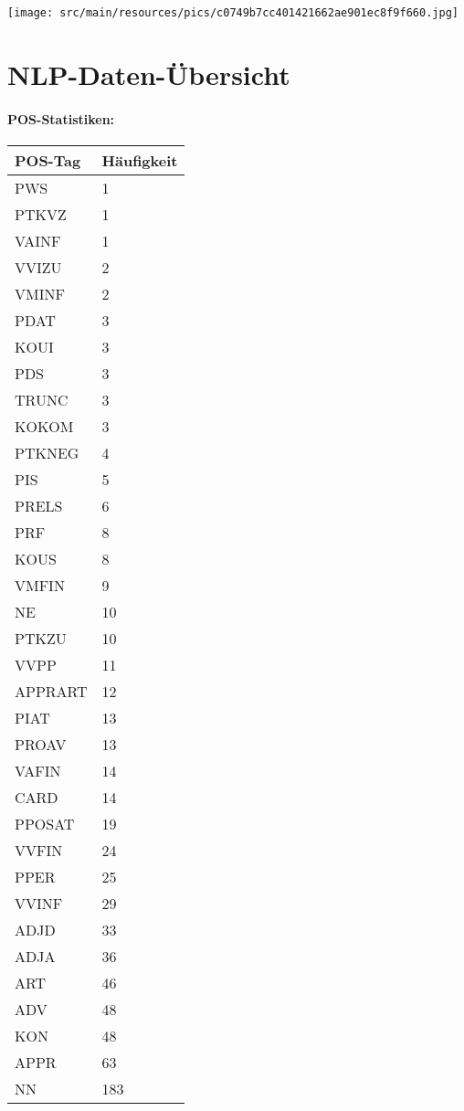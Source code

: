 \documentclass{article}
\begin{document}
\texttt{[image: src/main/resources/pics/c0749b7cc401421662ae901ec8f9f660.jpg]}\section{NLP-Daten-Übersicht}
\paragraph{POS-Statistiken:}
\begin{tabular}{ll}
\hline
POS-Tag & Häufigkeit \\ \hline
PWS & 1 \\ \hline
PTKVZ & 1 \\ \hline
VAINF & 1 \\ \hline
VVIZU & 2 \\ \hline
VMINF & 2 \\ \hline
PDAT & 3 \\ \hline
KOUI & 3 \\ \hline
PDS & 3 \\ \hline
TRUNC & 3 \\ \hline
KOKOM & 3 \\ \hline
PTKNEG & 4 \\ \hline
PIS & 5 \\ \hline
PRELS & 6 \\ \hline
PRF & 8 \\ \hline
KOUS & 8 \\ \hline
VMFIN & 9 \\ \hline
NE & 10 \\ \hline
PTKZU & 10 \\ \hline
VVPP & 11 \\ \hline
APPRART & 12 \\ \hline
PIAT & 13 \\ \hline
PROAV & 13 \\ \hline
VAFIN & 14 \\ \hline
CARD & 14 \\ \hline
PPOSAT & 19 \\ \hline
VVFIN & 24 \\ \hline
PPER & 25 \\ \hline
VVINF & 29 \\ \hline
ADJD & 33 \\ \hline
ADJA & 36 \\ \hline
ART & 46 \\ \hline
ADV & 48 \\ \hline
KON & 48 \\ \hline
APPR & 63 \\ \hline
NN & 183 \\ \hline
\end{tabular}
\end{document}
